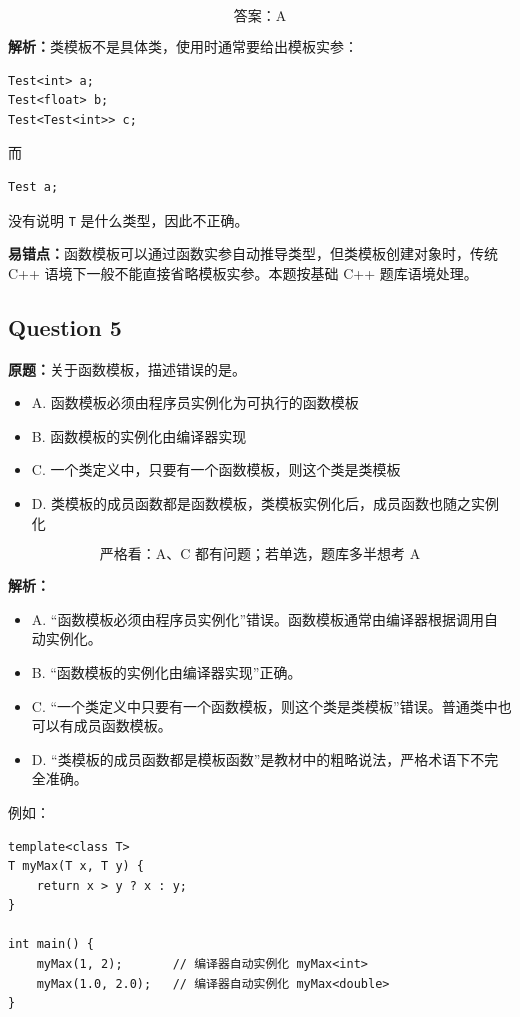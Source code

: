 \documentclass[11pt, a4paper]{article}
\begin{document}
\[
\boxed{\text{答案：A}}
\]

\textbf{解析：}类模板不是具体类，使用时通常要给出模板实参：
\begin{lstlisting}
Test<int> a;
Test<float> b;
Test<Test<int>> c;
\end{lstlisting}
而
\begin{lstlisting}
Test a;
\end{lstlisting}
没有说明 \texttt{T} 是什么类型，因此不正确。

\textbf{易错点：}函数模板可以通过函数实参自动推导类型，但类模板创建对象时，传统 C++ 语境下一般不能直接省略模板实参。本题按基础 C++ 题库语境处理。


\subsection*{Question 5}
\textbf{原题：}关于函数模板，描述错误的是。
\begin{itemize}
    \item A. 函数模板必须由程序员实例化为可执行的函数模板
    \item B. 函数模板的实例化由编译器实现
    \item C. 一个类定义中，只要有一个函数模板，则这个类是类模板
    \item D. 类模板的成员函数都是函数模板，类模板实例化后，成员函数也随之实例化
\end{itemize}

\[
\boxed{\text{严格看：A、C 都有问题；若单选，题库多半想考 A}}
\]

\textbf{解析：}
\begin{itemize}
    \item A. “函数模板必须由程序员实例化”错误。函数模板通常由编译器根据调用自动实例化。
    \item B. “函数模板的实例化由编译器实现”正确。
    \item C. “一个类定义中只要有一个函数模板，则这个类是类模板”错误。普通类中也可以有成员函数模板。
    \item D. “类模板的成员函数都是模板函数”是教材中的粗略说法，严格术语下不完全准确。
\end{itemize}

例如：
\begin{lstlisting}
template<class T>
T myMax(T x, T y) {
    return x > y ? x : y;
}

int main() {
    myMax(1, 2);       // 编译器自动实例化 myMax<int>
    myMax(1.0, 2.0);   // 编译器自动实例化 myMax<double>
}
\end{lstlisting}
\end{document}
